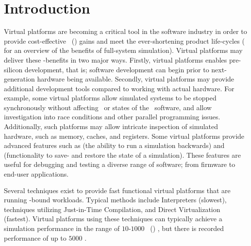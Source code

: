 
\chapter*{Introduction}
\label{cha:introduction}
Virtual platforms are becoming a critical tool in the software industry in order to provide cost-effective \termtimetomarket ~(\termttm) gains and meet the ever-shortening product life-cycles ( for an overview of the benefits of full-system simulation).
Virtual platforms may deliver these \termttm -benefits in two major ways.
Firstly, virtual platforms enables pre-silicon development, that is; software development can begin prior to next-generation hardware being available.
Secondly, virtual platforms may provide additional development tools compared to working with actual hardware.
For example, some virtual platforms allow simulated systems to be stopped synchronously without affecting \termtiming\ or states of the \termtarget\ software, and allow investigation into race conditions and other parallel programming issues.
Additionally, such platforms may allow intricate inspection of simulated hardware, such as memory, caches, and registers.
Some virtual platforms provide advanced features such as \termrevexe {} (the ability to run a simulation backwards) and \termcheckpointing {} (functionality to save- and restore the state of a simulation). 
These features are useful for debugging and testing a diverse range of software; from firmware to end-user applications.

Several techniques exist to provide fast functional virtual platforms that are running \termcpu -bound workloads. Typical methods include Interpreters (slowest), techniques utilizing Just-in-Time Compilation, and Direct Virtualization (fastest).
Virtual platforms using these techniques can typically achieve a simulation performance in the range of $10$-$1000$ \termmillioninstructionspersecond\ (\termmips ) , but there is recorded performance of up to $5000$ \termmips {}.\\

